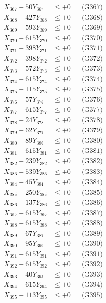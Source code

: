 \documentclass[a4paper,10pt]{article}
\begin{document}
{\begin{align}
X_{367} - 50Y_{367} &\leq +0 && \text{(G367)} \\
X_{368} - 427Y_{368} &\leq +0 && \text{(G368)} \\
X_{369} - 593Y_{369} &\leq +0 && \text{(G369)} \\
X_{370} - 615Y_{370} &\leq +0 && \text{(G370)} \\
\allowbreak
X_{371} - 398Y_{371} &\leq +0 && \text{(G371)} \\
X_{372} - 398Y_{372} &\leq +0 && \text{(G372)} \\
X_{373} - 572Y_{373} &\leq +0 && \text{(G373)} \\
X_{374} - 615Y_{374} &\leq +0 && \text{(G374)} \\
X_{375} - 115Y_{375} &\leq +0 && \text{(G375)} \\
X_{376} - 57Y_{376} &\leq +0 && \text{(G376)} \\
X_{377} - 615Y_{377} &\leq +0 && \text{(G377)} \\
X_{378} - 24Y_{378} &\leq +0 && \text{(G378)} \\
X_{379} - 62Y_{379} &\leq +0 && \text{(G379)} \\
X_{380} - 89Y_{380} &\leq +0 && \text{(G380)} \\
\allowbreak
X_{381} - 615Y_{381} &\leq +0 && \text{(G381)} \\
X_{382} - 239Y_{382} &\leq +0 && \text{(G382)} \\
X_{383} - 539Y_{383} &\leq +0 && \text{(G383)} \\
X_{384} - 45Y_{384} &\leq +0 && \text{(G384)} \\
X_{385} - 250Y_{385} &\leq +0 && \text{(G385)} \\
X_{386} - 137Y_{386} &\leq +0 && \text{(G386)} \\
X_{387} - 615Y_{387} &\leq +0 && \text{(G387)} \\
X_{388} - 615Y_{388} &\leq +0 && \text{(G388)} \\
X_{389} - 67Y_{389} &\leq +0 && \text{(G389)} \\
X_{390} - 95Y_{390} &\leq +0 && \text{(G390)} \\
\allowbreak
X_{391} - 615Y_{391} &\leq +0 && \text{(G391)} \\
X_{392} - 615Y_{392} &\leq +0 && \text{(G392)} \\
X_{393} - 40Y_{393} &\leq +0 && \text{(G393)} \\
X_{394} - 615Y_{394} &\leq +0 && \text{(G394)} \\
X_{395} - 113Y_{395} &\leq +0 && \text{(G395)} \\

\end{align}}
\end{document}

